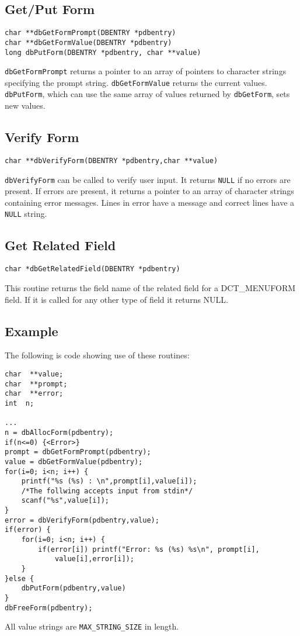 \subsection{Get/Put Form}

\begin{verbatim}char **dbGetFormPrompt(DBENTRY *pdbentry)
char **dbGetFormValue(DBENTRY *pdbentry)
long dbPutForm(DBENTRY *pdbentry, char **value)
\end{verbatim}
\verb|dbGetFormPrompt| returns a pointer to an array of pointers to character strings specifying the prompt string. 
\verb|dbGetFormValue| returns the current values. \verb|dbPutForm|, which can use the same array of values returned by 
\verb|dbGetForm|, sets new values.

\subsection{Verify Form}

\begin{verbatim}char **dbVerifyForm(DBENTRY *pdbentry,char **value)
\end{verbatim}\verb|dbVerifyForm| can be called to verify user input. It returns \verb|NULL| if no errors are present. If errors are present, it returns 
a pointer to an array of character strings containing error messages. Lines in error have a message and correct lines have a 
\verb|NULL| string.

\subsection{Get Related Field}

\begin{verbatim}char *dbGetRelatedField(DBENTRY *pdbentry)
\end{verbatim}This routine returns the field name of the related field for a DCT\_MENUFORM field. If it is called for any other type of 
field it returns NULL.

\subsection{Example}

The following is code showing use of these routines:

\begin{verbatim}
char  **value;
char  **prompt;
char  **error;
int  n;

...
n = dbAllocForm(pdbentry);
if(n<=0) {<Error>}
prompt = dbGetFormPrompt(pdbentry);
value = dbGetFormValue(pdbentry);
for(i=0; i<n; i++) {
    printf("%s (%s) : \n",prompt[i],value[i]);
    /*The follwing accepts input from stdin*/
    scanf("%s",value[i]);
}
error = dbVerifyForm(pdbentry,value);
if(error) {
    for(i=0; i<n; i++) {
        if(error[i]) printf("Error: %s (%s) %s\n", prompt[i],
            value[i],error[i]);
    }
}else {
    dbPutForm(pdbentry,value)
}
dbFreeForm(pdbentry);
\end{verbatim}All value strings are \verb|MAX_STRING_SIZE| in length.


